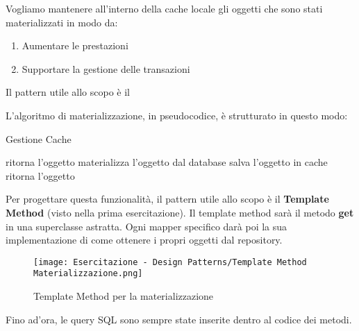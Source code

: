 {    \newpage
    
    \newpage
    

    Vogliamo mantenere all'interno della cache locale gli oggetti che sono stati materializzati in modo da:
    \begin{enumerate}
        \item Aumentare le prestazioni
        \item Supportare la gestione delle transazioni
    \end{enumerate}

    Il pattern utile allo scopo è il 
    
    L'algoritmo di materializzazione, in pseudocodice, è strutturato in questo modo:
    \vspace{-0.1cm}
    \begin{algorithm}
        \caption{Gestione Cache}
        \begin{algorithmic}[1]
            \State ritorna l'oggetto
            \Else
            \State materializza l'oggetto dal database
            \State salva l'oggetto in cache
            \State ritorna l'oggetto
            \EndIf
        \end{algorithmic}
    \end{algorithm}
    \vspace{-0.1cm}

    Per progettare questa funzionalità, il pattern utile allo scopo è il \textbf{Template Method} (visto nella prima esercitazione).
    Il template method sarà il metodo \textbf{get} in una superclasse astratta. Ogni mapper specifico darà poi la sua implementazione
    di come ottenere i propri oggetti dal repository.

    \setcounter{figure}{0}
    \begin{figure}[H]
        \caption{Template Method per la materializzazione}
        \centering
        \texttt{[image: Esercitazione - Design Patterns/Template Method Materializzazione.png]}
    \end{figure}

    \newpage
    Fino ad'ora, le query SQL sono sempre state inserite dentro al codice dei metodi.

}

